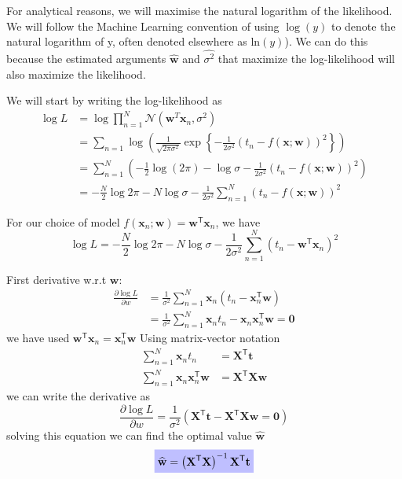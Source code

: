 \documentclass[a4paper,11pt]{article} %
\newcommand{\highlighteq}[1]{\colorbox{blue!25}{$\displaystyle#1$}}
\begin{document}
For analytical reasons, we will maximise the natural logarithm of the likelihood.
We will follow the Machine Learning convention of using $\log(y)$ to denote the
natural logarithm of y, often denoted elsewhere as $\mathrm{ln}(y)$).
We can do this because the estimated arguments $\widehat{\mathbf{w}}$
and $\widehat{\sigma^2}$ that maximize the log-likelihood will also maximize
the likelihood.

We will start by writing the log-likelihood as
\begin{align*}
\log L & = \log \prod_{n=1}^{N} \mathcal{N}(\mathbf{w}^{T}\mathbf{x}_{n},\sigma^2) \\
& = \sum_{n=1} \log \left( \frac{1}{\sqrt{2\pi\sigma^2}}
\exp\left\{ -\frac{1}{2\sigma^2}
\left( t_{n} - f(\mathbf{x};\mathbf{w}) \right)^2
\right\} \right) \\
& = \sum_{n=1}^{N} \left(
-\frac{1}{2}\log(2\pi) - \log\sigma - \frac{1}{2\sigma^2}
\left( t_{n} - f(\mathbf{x};\mathbf{w}) \right)^2 \right) \\
& = -\frac{N}{2}\log 2\pi - N\log\sigma - \frac{1}{2\sigma^2}
\sum_{n=1}^{N} \left( t_{n} - f(\mathbf{x};\mathbf{w}) \right)^2
\end{align*}

For our choice of model
$f(\mathbf{x}_{n}; \mathbf{w}) = \mathbf{w}^{\mathsf{T}}\mathbf{x}_{n}$, we have
\begin{equation}
\log L = -\frac{N}{2} \log 2\pi - N\log\sigma - \frac{1}{2\sigma^2}
\sum_{n=1}^{N} \left( t_{n} - \mathbf{w}^{\mathsf{T}}\mathbf{x}_{n} \right)^2
\end{equation}

First derivative w.r.t $\mathbf{w}$:
\begin{align*}
\frac{\partial\log L}{\partial w} & = \frac{1}{\sigma^2}
\sum_{n=1}^{N} \mathbf{x}_{n} \left( t_{n} - \mathbf{x}^{\mathsf{T}}_{n} \mathbf{w} \right) \\
& = \frac{1}{\sigma^2}\sum_{n=1}^{N} \mathbf{x}_{n} t_{n} - 
\mathbf{x}_{n}\mathbf{x}_{n}^{\mathsf{T}}\mathbf{w}
= \mathbf{0}
\end{align*}
we have used
$\mathbf{w}^{\mathsf{T}}\mathbf{x}_{n} = \mathbf{x}_{n}^{\mathsf{T}}\mathbf{w}$
%
Using matrix-vector notation
\begin{align*}
\sum_{n=1}^{N} \mathbf{x}_{n} t_{n} & = \mathbf{X}^{\mathsf{T}}\mathbf{t} \\
\sum_{n=1}^{N} \mathbf{x}_{n} \mathbf{x}_{n}^{\mathsf{T}}\mathbf{w} & = 
\mathbf{X}^{\mathsf{T}}\mathbf{X}\mathbf{w}
\end{align*}
we can write the derivative as
\begin{equation}
\frac{\partial\log L}{\partial w} = \frac{1}{\sigma^2}\left(
\mathbf{X}^{\mathsf{T}}\mathbf{t} - \mathbf{X}^{\mathsf{T}}\mathbf{X}\mathbf{w} = \mathbf{0}
\right)
\end{equation}
solving this equation we can find the optimal value $\widehat{\mathbf{w}}$
\begin{equation}
\highlighteq{
\widehat{\mathbf{w}} = \left(\mathbf{X}^{\mathsf{T}}\mathbf{X}\right)^{-1}
\mathbf{X}^{\mathsf{T}}\mathbf{t}
}
\end{equation}
\end{document}
